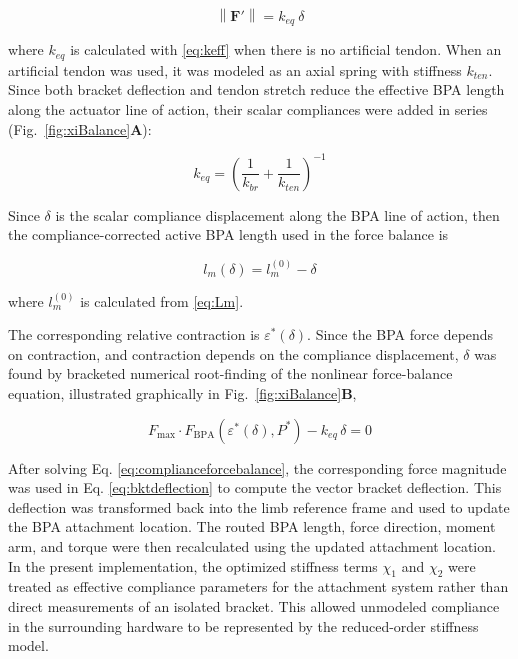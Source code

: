 \begin{equation} \left\| \mathbf{F}' \right\| = k_{eq} \: \delta
\label{eq:hookereduced}
\end{equation}

where $k_{eq}$ is calculated with \eqref{eq:keff} when there is no artificial tendon. When an artificial tendon was used, it was modeled as an axial spring with stiffness $k_{ten}$. Since both bracket deflection and tendon stretch reduce the effective BPA length along the actuator line of action, their scalar compliances were added in series (Fig.~\ref{fig:xiBalance}\textbf{A}):

\begin{equation} k_{eq} = \left( \frac{1}{k_{br}} + \frac{1}{k_{ten}} \right)^{-1}
\label{eq:equivalentstiffness}
\end{equation}

Since $\delta$ is the scalar compliance displacement along the BPA line of action, then the compliance-corrected active BPA length used in the force balance is

\begin{equation} l_m(\delta) = l_m^{(0)} - \delta
\label{eq:activelengthcorrected}
\end{equation}

where $l_m^{(0)}$ is calculated from \eqref{eq:Lm}.

The corresponding relative contraction is $\varepsilon^*(\delta)$. Since the BPA force depends on contraction, and contraction depends on the compliance displacement, $\delta$ was found by bracketed numerical root-finding of the nonlinear force-balance equation, illustrated graphically in Fig.~\ref{fig:xiBalance}\textbf{B},

\begin{equation} F_{\mathrm{max}} \cdot F_{\mathrm{BPA}}\!\left(\varepsilon^*(\delta),P^*\right) - k_{eq}\,\delta = 0
\label{eq:complianceforcebalance}
\end{equation}

After solving Eq. \ref{eq:complianceforcebalance}, the corresponding force magnitude was used in Eq. \ref{eq:bktdeflection} to compute the vector bracket deflection. This deflection was transformed back into the limb reference frame and used to update the BPA attachment location. The routed BPA length, force direction, moment arm, and torque were then recalculated using the updated attachment location. In the present implementation, the optimized stiffness terms $\chi_{1}$ and $\chi_{2}$ were treated as effective compliance parameters for the attachment system rather than direct measurements of an isolated bracket. This allowed unmodeled compliance in the surrounding hardware to be represented by the reduced-order stiffness model.

